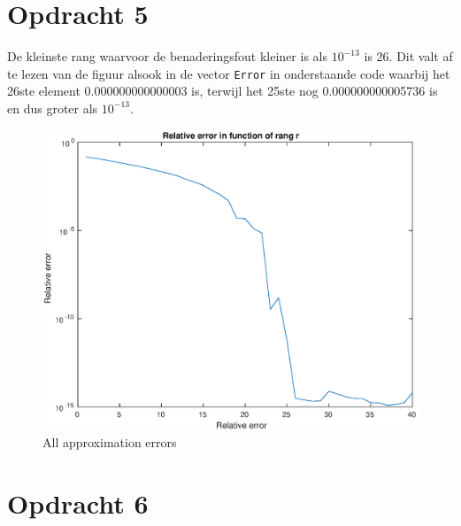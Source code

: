 \documentclass[11pt,a4paper]{article}
\begin{document}
\section*{Opdracht 5}
De kleinste rang waarvoor de benaderingsfout kleiner is als $10^{-13}$ is 26.
Dit valt af te lezen van de figuur alsook in de vector \texttt{Error} in onderstaande code waarbij het 26ste element 0.000000000000003 is, terwijl het 25ste nog 0.000000000005736 is en dus groter als $10^{-13}$.
\begin{figure}[H]
\centering
\includegraphics[scale=0.55]{opdracht5}
\caption{All approximation errors}
\end{figure}




\section*{Opdracht 6}
\end{document}
